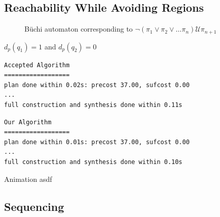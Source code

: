 \documentclass{beamer}
\newcommand{\U}{\bm{\mathcal{U}}}
\begin{document}
\subsection{Reachability While Avoiding Regions}
\begin{frame}[fragile]
\begin{figure}
\centering
{}
\caption{B\"{u}chi automaton corresponding to $\neg (\pi_1 \lor \pi_2 \lor \dots \pi_n) \U \pi_{n+1}$}
\end{figure}
\centering $d_p(q_1)=1$ and $d_p(q_2)=0$

\begingroup
\fontsize{9pt}{12pt}\selectfont
\begin{lstlisting}
Accepted Algorithm
==================
plan done within 0.02s: precost 37.00, sufcost 0.00
...
full construction and synthesis done within 0.11s
\end{lstlisting}
\endgroup
\begingroup
\fontsize{9pt}{12pt}\selectfont
\begin{lstlisting}
Our Algorithm
==================
plan done within 0.01s: precost 37.00, sufcost 0.00
...
full construction and synthesis done within 0.10s 
\end{lstlisting}
\endgroup



\end{frame}

\begin{frame}{Animation}
asdf
\end{frame}

\subsection{Sequencing}
\end{document}
